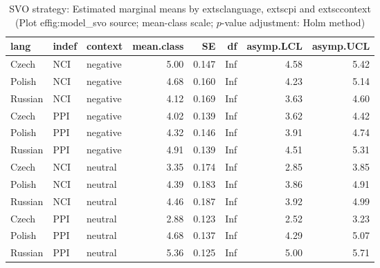 \begin{table}[!h]
\centering
\caption{SVO strategy: Estimated marginal means by 	extsc{language}, 	extsc{pi} and 	extsc{context} (Plot 
ef{fig:model_svo} source; mean-class scale; $p$-value adjustment: Holm method)}
\centering
\begin{tabular}[t]{lllrrrrr}
\toprule
lang & indef & context & mean.class & SE & df & asymp.LCL & asymp.UCL\\
\midrule
Czech & NCI & negative & 5.00 & 0.147 & Inf & 4.58 & 5.42\\
Polish & NCI & negative & 4.68 & 0.160 & Inf & 4.23 & 5.14\\
Russian & NCI & negative & 4.12 & 0.169 & Inf & 3.63 & 4.60\\
Czech & PPI & negative & 4.02 & 0.139 & Inf & 3.62 & 4.42\\
Polish & PPI & negative & 4.32 & 0.146 & Inf & 3.91 & 4.74\\
\addlinespace
Russian & PPI & negative & 4.91 & 0.139 & Inf & 4.51 & 5.31\\
Czech & NCI & neutral & 3.35 & 0.174 & Inf & 2.85 & 3.85\\
Polish & NCI & neutral & 4.39 & 0.183 & Inf & 3.86 & 4.91\\
Russian & NCI & neutral & 4.46 & 0.187 & Inf & 3.92 & 4.99\\
Czech & PPI & neutral & 2.88 & 0.123 & Inf & 2.52 & 3.23\\
\addlinespace
Polish & PPI & neutral & 4.68 & 0.137 & Inf & 4.29 & 5.07\\
Russian & PPI & neutral & 5.36 & 0.125 & Inf & 5.00 & 5.71\\
\bottomrule
\end{tabular}
\end{table}
